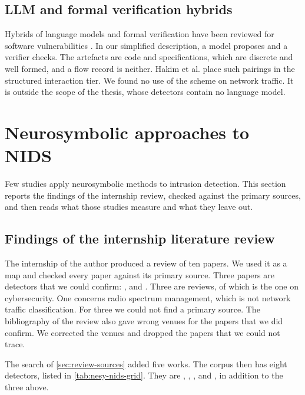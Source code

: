 \subsection{LLM and formal verification hybrids}
\label{sec:nesy-llm-formal}

Hybrids of language models and formal verification have been reviewed for
software vulnerabilities \citep{tihanyi2025vulnerability}. In our simplified
description, a model proposes and a verifier checks. The artefacts are code and specifications, which are discrete
and well formed, and a flow record is neither. Hakim et al. place such pairings
in the structured interaction tier. We found no use of the scheme on network
traffic. It is outside the scope of the thesis, whose detectors contain no
language model.

\section{Neurosymbolic approaches to NIDS}
\label{sec:nesy-nids}

Few studies apply neurosymbolic methods to intrusion detection. This section reports the
findings of the internship review, checked against the primary sources, and then reads what
those studies measure and what they leave out.

\subsection{Findings of the internship literature review}
\label{sec:internship-findings}

The internship of the author produced a review of ten papers. We used it as a
map and checked every paper against its primary source. Three papers are
detectors that we could confirm: \citet{onchis2022neurosymbolic},
\citet{bizzarri2024nsaids} and \citet{kalutharage2025neurosymbolic}. Three are
reviews, of which \citet{hakim2025nesycybersecurity} is the one on
cybersecurity. One concerns radio spectrum management, which is not network
traffic classification. For three we could not find a primary source. The
bibliography of the review also gave wrong venues for the papers that we did
confirm. We corrected the venues and dropped the papers that we could not trace.

The search of \cref{sec:review-sources} added five works. The corpus then has
eight detectors, listed in \cref{tab:nesy-nids-grid}. They are
\citet{tran2025odxu}, \citet{tran2025transfer}, \citet{aresrobledo2025hyperparameter},
\citet{zhou2024knowgraph} and \citet{alemayehu2026deployment}, in addition to the
three above.

